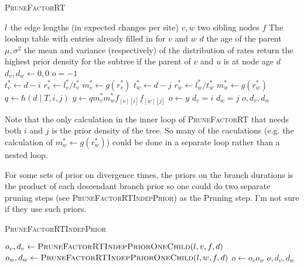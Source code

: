 \documentclass{llncs}
\newcommand{\tree}[0]{\ensuremath{T}\xspace}
\newcommand{\edgeLen}[1]{\ensuremath{l_{#1}}\xspace}
\newcommand{\subtreeOptFactor}[2]{\ensuremath{f_{[{#1}][{#2}]}}\xspace}
\newcommand{\ratePriorDensity}[0]{\ensuremath{g}\xspace}
\newcommand{\timePriorDensity}[0]{\ensuremath{h}\xspace}
\begin{document}
\begin{algorithm} \caption{\textsc{PruneFactorRT}}\label{pruneFactorRT}
\begin{algorithmic}
    \REQUIRE $\edgeLen{}$ the edge lengths (in expected changes per site)
\REQUIRE $v, w$ two sibling nodes
\REQUIRE $f$ The lookup table with entries already filled in for $v$ and $w$
\REQUIRE $d$ the age of the parent
\REQUIRE $\mu, \sigma^2$ the mean and variance (respectively) of the distribution of rates
\ENSURE return the highest prior density for the subtree if the parent of $v$ and $u$ is at node age $d$\\
\STATE $d_v, d_w \leftarrow 0, 0$
\STATE $o = -1$ \\
\FOR{$i \in [0, 1, \ldots, d)$ }
    \STATE $t_v^{\ast} \leftarrow d - i$
    \STATE $r_v^{\ast} \leftarrow l_v^{\ast} / t_v^{\ast}$
    \STATE $m_v^{\ast} \leftarrow \ratePriorDensity(r_v^{\ast})$
    \FOR{$j \in [0, 1, \ldots, d)$ }
        \STATE $t_w^{\ast} \leftarrow d - j$
        \STATE $r_w^{\ast} \leftarrow l_w^{\ast} / t_w^{\ast}$
        \STATE $m_w^{\ast} \leftarrow \ratePriorDensity(r_w^{\ast})$
        \STATE $q \leftarrow \timePriorDensity(d \mid \tree, i, j)$
        \STATE $y \leftarrow q m_v^{\ast} m_w^{\ast} \subtreeOptFactor{v}{i} \subtreeOptFactor{w}{j}$
            \STATE $o \leftarrow y$
            \STATE $d_v = i$
            \STATE $d_w = j$
        \ENDIF
    \ENDFOR
\ENDFOR
\RETURN $o, d_v, d_w$
\end{algorithmic}
\end{algorithm}

Note that the only calculation in the inner loop of \textsc{PruneFactorRT} that needs both $i$ and $j$ is the prior density of the tree.
So many of the caculations (e.g. the calculation of $m_w^{\ast} \leftarrow \ratePriorDensity(r_w^{\ast})$)
could be done in a separate loop rather than a nested loop.

For some sets of prior on divergence times, the priors on the branch durations is 
the product of each descendant branch prior so one could do two separate pruning
steps
(see \textsc{PruneFactorRTIndepPrior}) as the Pruning step.
I'm not sure if they use such priors.

\begin{algorithm} \caption{\textsc{PruneFactorRTIndepPrior}}\label{pruneFactorRTIndep}
\begin{algorithmic}
    \STATE $o_v, d_v\leftarrow \mbox{\textsc{PruneFactorRTIndepPriorOneChild}}(l, v, f, d)$
    \STATE $o_w, d_w\leftarrow \mbox{\textsc{PruneFactorRTIndepPriorOneChild}}(l, w, f, d)$
    \STATE $o \leftarrow o_v o_w$
    \RETURN $o, d_v, d_w$
\end{algorithmic}
\end{algorithm}
\end{document}
